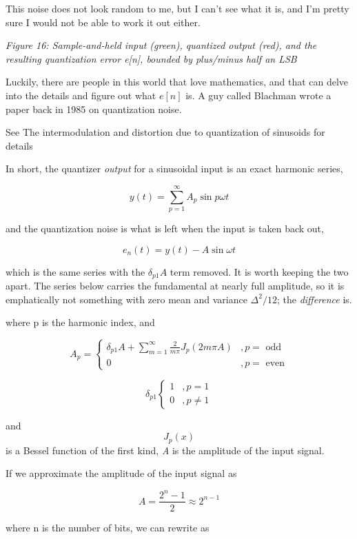 This noise does not look random to me, but I can't see what it is, and
I'm pretty sure I would not be able to work it out either.


{
\centering
{}
}

\emph{Figure 16: Sample-and-held input (green), quantized output (red),
and the resulting quantization error e{[}n{]}, bounded by plus/minus
half an LSB}

Luckily, there are people in this world that love mathematics, and that
can delve into the details and figure out what \(e[n]\) is. A guy called
Blachman wrote a paper back in 1985 on quantization noise.

See The intermodulation and distortion due to quantization of sinusoids
 for details

In short, the quantizer \emph{output} for a sinusoidal input is an exact
harmonic series,

\[y(t) = \sum_{p=1}^\infty{A_p\sin{p\omega t}}\]

and the quantization noise is what is left when the input is taken back
out,

\[ e_n(t) = y(t) - A\sin{\omega t} \]

which is the same series with the \(\delta_{p1}A\) term removed. It is
worth keeping the two apart. The series below carries the fundamental at
nearly full amplitude, so it is emphatically not something with zero
mean and variance \(\Delta^2/12\); the \emph{difference} is.

where p is the harmonic index, and

\[
A_p = 
\begin{cases}
\delta_{p1}A  + \sum_{m =
  1}^\infty{\frac{2}{m\pi}J_p(2m\pi A)} &, p = \text{ odd} \\
 0 &, p = \text{ even}
\end{cases}
\]

\[
\delta_{p1}
\begin{cases}
1 &, p=1 \\
0 &, p \neq 1
\end{cases}
\]

and \[J_p(x)\] is a Bessel function of the first kind, \emph{A} is the
amplitude of the input signal.

If we approximate the amplitude of the input signal as

\[A = \frac{2^n - 1}{2} \approx 2^{n-1}\]

where n is the number of bits, we can rewrite as

